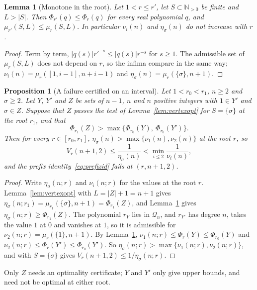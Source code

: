 \documentclass[11pt]{article}
\newtheorem{lemma}[theorem]{Lemma}
\newtheorem{proposition}[theorem]{Proposition}
\newcommand{\N}{\mathbb N}
\begin{document}
\begin{lemma}[Monotone in the root]\label{lem:rootmono}
Let $1<r\le r'$, let $S\subset\N_{>0}$ be finite and $L>|S|$.  Then
$\Phi_{r'}(q)\le\Phi_r(q)$ for every real polynomial $q$, and
$\mu_{r'}(S,L)\le\mu_r(S,L)$.  In particular $\nu_i(n)$ and
$\eta_\sigma(n)$ do not increase with $r$.
\end{lemma}

\begin{proof}
Term by term, $|q(s)|r'^{-s}\le|q(s)|r^{-s}$ for $s\ge1$.  The admissible
set of $\mu_r(S,L)$ does not depend on $r$, so the infima compare in the
same way; $\nu_i(n)=\mu_r([1,i-1],n+i-1)$ and
$\eta_\sigma(n)=\mu_r(\{\sigma\},n+1)$.
\end{proof}

\begin{proposition}[A failure certified on an interval]\label{prop:failinterval}
Let $1<r_0<r_1$, $n\ge2$ and $\sigma\ge2$.  Let $Y$, $Y'$ and $Z$ be sets
of $n-1$, $n$ and $n$ positive integers with $1\in Y'$ and $\sigma\in Z$.
Suppose that $Z$ passes the test of Lemma~\ref{lem:vertexopt} for
$S=\{\sigma\}$ at the root $r_1$, and that
\[
  \Phi_{r_1}(Z)>\max\bigl\{\Phi_{r_0}(Y),\ \Phi_{r_0}(Y')\bigr\}.
\]
Then for every $r\in[r_0,r_1]$, $\eta_\sigma(n)>\max\{\nu_1(n),\nu_2(n)\}$
at the root $r$, so
\[
  V_r(n+1,2)\le\frac1{\eta_\sigma(n)}<\min_{i\le2}\frac1{\nu_i(n)},
\]
and the prefix identity~\eqref{eq:prefixid} fails at $(r,n+1,2)$.
\end{proposition}

\begin{proof}
Write $\eta_\sigma(n;r)$ and $\nu_i(n;r)$ for the values at the root $r$.
Lemma~\ref{lem:vertexopt} with $L=|Z|+1=n+1$ gives
$\eta_\sigma(n;r_1)=\mu_{r_1}(\{\sigma\},n+1)=\Phi_{r_1}(Z)$, and
Lemma~\ref{lem:rootmono} gives $\eta_\sigma(n;r)\ge\Phi_{r_1}(Z)$.  The
polynomial $r_Y$ lies in $\mathcal Q_n$, and $r_{Y'}$ has degree $n$, takes
the value $1$ at $0$ and vanishes at $1$, so it is admissible for
$\nu_2(n;r)=\mu_r(\{1\},n+1)$.  By Lemma~\ref{lem:rootmono},
$\nu_1(n;r)\le\Phi_r(Y)\le\Phi_{r_0}(Y)$ and
$\nu_2(n;r)\le\Phi_r(Y')\le\Phi_{r_0}(Y')$.  So
$\eta_\sigma(n;r)>\max\{\nu_1(n;r),\nu_2(n;r)\}$, and
\cite[Proposition~2.1(b)]{coefficient-mass-rows} with $S=\{\sigma\}$ gives
$V_r(n+1,2)\le1/\eta_\sigma(n;r)$.
\end{proof}

Only $Z$ needs an optimality certificate; $Y$ and $Y'$ only give upper
bounds, and need not be optimal at either root.
\end{document}
